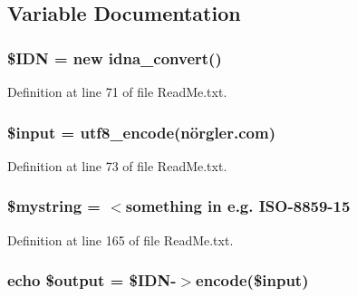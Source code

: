 \subsection{Variable Documentation}
\subsubsection[{\texorpdfstring{\$\+I\+DN}{$IDN}}]{\setlength{\rightskip}{0pt plus 5cm}\$I\+DN = new {\bf idna\+\_\+convert}()}\hypertarget{ReadMe_8txt_aa45ac61e5ada434ea385befcd1aea16d}{}\label{ReadMe_8txt_aa45ac61e5ada434ea385befcd1aea16d}


Definition at line 71 of file Read\+Me.\+txt.

\subsubsection[{\texorpdfstring{\$input}{$input}}]{\setlength{\rightskip}{0pt plus 5cm}\$input = {\bf utf8\+\_\+encode}(\textquotesingle{}nörgler.\+com\textquotesingle{})}\hypertarget{ReadMe_8txt_a69b271260be394b90709736cccb22c76}{}\label{ReadMe_8txt_a69b271260be394b90709736cccb22c76}


Definition at line 73 of file Read\+Me.\+txt.

\subsubsection[{\texorpdfstring{\$mystring}{$mystring}}]{\setlength{\rightskip}{0pt plus 5cm}\$mystring = \textquotesingle{}$<$something in e.\+g. I\+SO-\/8859-\/15\textquotesingle{}}\hypertarget{ReadMe_8txt_a503c6b90c33b5264d35bf22df6f91b28}{}\label{ReadMe_8txt_a503c6b90c33b5264d35bf22df6f91b28}


Definition at line 165 of file Read\+Me.\+txt.

\subsubsection[{\texorpdfstring{\$output}{$output}}]{\setlength{\rightskip}{0pt plus 5cm}echo \$output = \$I\+DN-\/$>${\bf encode}(\$input)}\hypertarget{ReadMe_8txt_aa3809a6a370ae4aeb5c4e9a7527950ac}{}\label{ReadMe_8txt_aa3809a6a370ae4aeb5c4e9a7527950ac}



